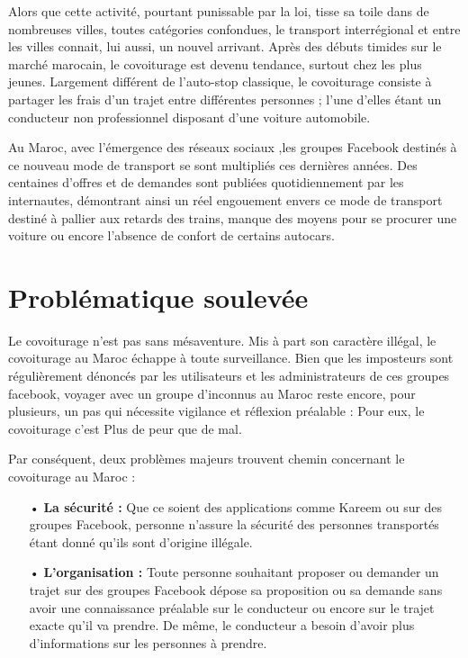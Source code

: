 \documentclass[a4paper]{report}
\begin{document}
Alors que cette activité, pourtant punissable par la loi, tisse sa toile dans de nombreuses villes, toutes catégories confondues, le transport interrégional et entre les villes connait, lui aussi, un nouvel arrivant. Après des débuts timides sur le marché marocain, le covoiturage est devenu tendance, surtout chez les plus jeunes. Largement différent de l'auto-stop classique, le covoiturage consiste à partager les frais d’un trajet entre différentes personnes ; l’une d’elles étant un conducteur non professionnel disposant d’une voiture automobile.

Au Maroc, avec l’émergence des réseaux sociaux ,les groupes Facebook destinés à ce nouveau mode de transport se sont multipliés ces dernières années. Des centaines d’offres et de demandes sont publiées quotidiennement par les internautes, démontrant ainsi un réel engouement envers ce mode de transport destiné à pallier aux retards des trains, manque des moyens pour se procurer une voiture ou encore l’absence de confort de certains autocars.


\section{Problématique soulevée}
\par 
Le covoiturage n’est pas sans mésaventure. Mis à part son caractère illégal, le covoiturage au Maroc échappe à toute surveillance. Bien que les imposteurs sont régulièrement dénoncés par les utilisateurs et les administrateurs de ces groupes facebook, voyager avec un groupe d’inconnus au Maroc reste encore, pour plusieurs, un pas qui nécessite vigilance et réflexion préalable : Pour eux, le covoiturage c'est \textsf{Plus de peur que de mal}.

\par 
Par conséquent, deux problèmes majeurs trouvent chemin concernant le covoiturage au Maroc :
\begin{itemize}
\item[•] \textbf{La sécurité :} Que ce soient des applications comme Kareem ou sur des groupes Facebook, personne n'assure la sécurité des personnes transportés étant donné qu'ils sont d'origine illégale. 
\item[•] \textbf{L'organisation :} Toute personne souhaitant proposer ou demander un trajet sur des groupes Facebook dépose sa proposition ou sa demande sans avoir une connaissance préalable sur le conducteur ou encore sur le trajet exacte qu'il va prendre. De même, le conducteur a besoin d'avoir plus d'informations sur les personnes à prendre.                 
\end{itemize}
\end{document}
